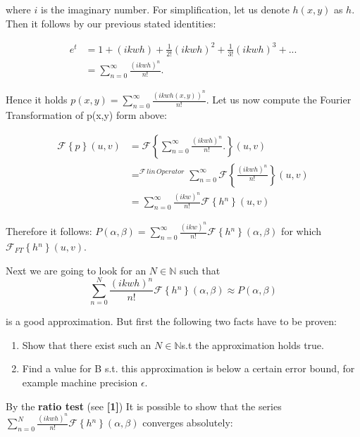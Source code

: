 where $i$ is the imaginary number. For simplification, let us denote $h(x,y)$ as $h$. Then it follows by our previous stated identities: 

\begin{align}
 e^{t}
 &=1+(ikwh)+\frac{1}{2!}(ikwh)^{2}+\frac{1}{3!}(ikwh)^{3}+... \nonumber \\
 &=\sum_{n=0}^{\infty}\frac{(ikwh)^{n}}{n!}.
\end{align}

Hence it holds $p(x,y)=\sum_{n=0}^{\infty}\frac{(ikwh(x,y))^{n}}{n!}$. Let us now compute the Fourier Transformation of p(x,y) form above:

\begin{align}
  \mathcal{F}\left\{ p\right\}(u,v)
  & =\mathcal{F}\left\{ \sum_{n=0}^{\infty}\frac{(ikwh)^{n}}{n!}.\right\}(u,v) \nonumber \\
  & =^{\mathcal{F}\, lin\, Operator}\sum_{n=0}^{\infty}\mathcal{F}\left\{ \frac{(ikwh)^{n}}{n!}\right\}(u,v) \nonumber \\
  & =\sum_{n=0}^{\infty}\frac{(ikw)^{n}}{n!}\mathcal{F}\left\{ h{}^{n}\right\}(u,v)
\end{align}

Therefore it follows: $P(\alpha,\beta)=\sum_{n=0}^{\infty}\frac{(ikw)^{n}}{n!}\mathcal{F}\left\{ h{}^{n}\right\} (\alpha,\beta)$ for which $\mathcal{F}_{FT}\left\{ h{}^{n}\right\} (u,v)$.

Next we are going to look for an $N\mathbb{\in N}$ such that 
\begin{equation}
 \sum_{n=0}^{N}\frac{(ikwh)^{n}}{n!}\mathcal{F}\left\{ h{}^{n}\right\} (\alpha,\beta) \approx P(\alpha,\beta) 
\end{equation}

is a good approximation. But first the following two facts have to be proven:

\begin{enumerate}
\item Show that there exist such an $N\mathbb{\in N}$s.t the approximation
holds true.
\item Find a value for B s.t. this approximation is below a certain error
bound, for example machine precision $\epsilon$. 
\end{enumerate}


By the \textbf{ratio test} (see \textbf{{[}1{]}}) 
It is possible to show that the series $\sum_{n=0}^{N}\frac{(ikwh)^{n}}{n!}\mathcal{F}\left\{ h{}^{n}\right\} (\alpha,\beta)$ converges absolutely:

